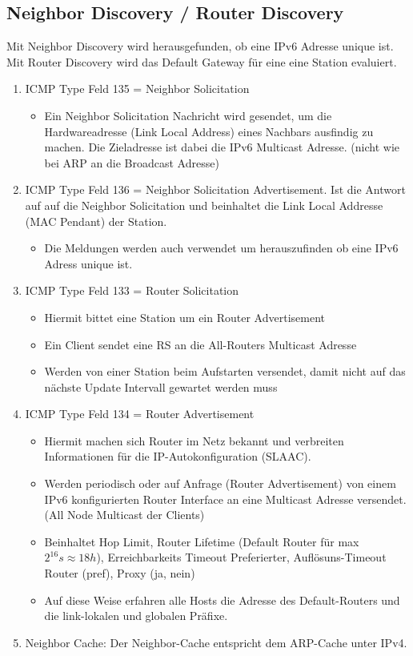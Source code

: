 \subsection{Neighbor Discovery / Router Discovery}
Mit Neighbor Discovery wird herausgefunden, ob eine IPv6 Adresse unique ist. Mit Router Discovery wird das Default Gateway für eine eine Station evaluiert.
\begin{enumerate}
	\item ICMP Type Feld 135 = Neighbor Solicitation
	\begin{itemize}
		\item Ein Neighbor Solicitation Nachricht wird gesendet, um die Hardwareadresse (Link Local Address) eines Nachbars ausfindig zu machen. Die Zieladresse ist dabei die IPv6 Multicast Adresse. (nicht wie bei ARP an die Broadcast Adresse)
	\end{itemize}
	\item ICMP Type Feld 136 = Neighbor Solicitation Advertisement. Ist die Antwort auf auf die Neighbor Solicitation und beinhaltet die Link Local Addresse (MAC Pendant) der Station.
	\begin{itemize}
		\item Die Meldungen werden auch verwendet um herauszufinden ob eine IPv6 Adress unique ist.
	\end{itemize}
	\item ICMP Type Feld 133 = Router Solicitation 
	\begin{itemize}
		\item Hiermit bittet eine Station um ein Router Advertisement
		\item Ein Client sendet eine RS an die All-Routers Multicast Adresse
		\item Werden von einer Station beim Aufstarten versendet, damit nicht auf das nächste Update Intervall gewartet werden muss
	\end{itemize}
	\item ICMP Type Feld 134 = Router Advertisement
	\begin{itemize}
		\item Hiermit machen sich Router im Netz bekannt und verbreiten Informationen für die IP-Autokonfiguration (SLAAC).
		\item Werden periodisch oder auf Anfrage (Router Advertisement) von einem IPv6 konfigurierten Router Interface an eine Multicast Adresse versendet. (All Node Multicast der Clients) 
		\item Beinhaltet Hop Limit, Router Lifetime (Default Router für max $2^{16}s \approx 18h$), Erreichbarkeits Timeout Preferierter, Auflösuns-Timeout Router (pref), Proxy (ja, nein) 
		\item Auf diese Weise erfahren alle Hosts die Adresse des Default-Routers und die link-lokalen und globalen Präfixe.
	\end{itemize}
	\item Neighbor Cache:  Der Neighbor-Cache entspricht dem ARP-Cache unter IPv4.
\end{enumerate}


